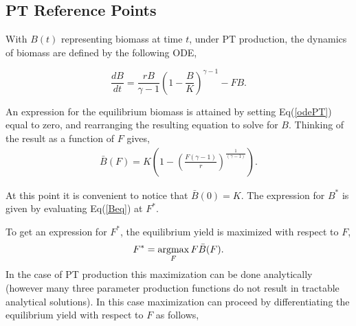 \documentclass[12pt]{article}
\newcommand{\argmax}{\operatornamewithlimits{argmax}}
\begin{document}

%
\subsection{PT Reference Points}\label{ptRef}

%
With $B(t)$ representing biomass at time $t$, under PT production, the 
dynamics of biomass are defined by the following ODE,
 
\begin{equation}
\frac{dB}{dt} = \frac{r B}{\gamma-1} \left(1-\frac{B}{K}\right)^{\gamma-1} - FB. \label{odePT}
\end{equation}

An expression for the equilibrium biomass is attained by setting Eq(\ref{odePT}) 
equal to zero, and rearranging the resulting equation to solve for $B$. 
Thinking of the result as a function of $F$ gives, 
\begin{align}
\bar B(F) = K\left(1-\left(\frac{F(\gamma-1)}{r}\right)^{\frac{1}{(\gamma-1)}}\right). \label{Beq}
\end{align}

At this point it is convenient to notice that $\bar B(0)=K$. The expression for $B^*$ is given by evaluating Eq(\ref{Beq}) at $F^*$.

%
To get an expression for $F^*$, the equilibrium yield is maximized with respect to $F$,
\begin{equation}
F^* = \argmax_F F\bar B(F).
\end{equation}
%
In the case of PT production this maximization can be done analytically (however 
many three parameter production functions do not result in tractable analytical 
solutions). In this case maximization can proceed by differentiating the 
equilibrium yield with respect to $F$ as follows,
\end{document}
